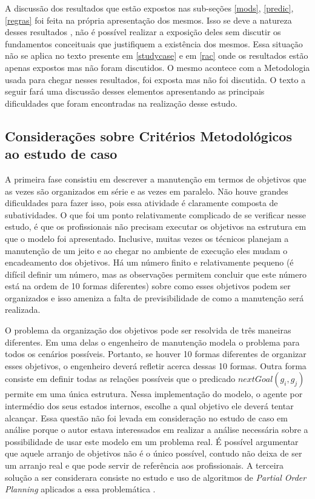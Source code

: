 A discussão dos resultados que estão expostos nas sub-seções \ref{mods}, \ref{predic}, \ref{regras} foi feita na própria apresentação dos mesmos. Isso se deve a natureza desses resultados , não é possível realizar a exposição deles sem discutir os fundamentos conceituais que justifiquem a existência dos mesmos. Essa situação não se aplica no texto presente em \ref{studycase} e em \ref{rac} onde os resultados estão apenas expostos mas não foram discutidos. O mesmo acontece com a Metodologia usada para chegar nesses resultados, foi exposta mas não foi discutida. O texto a seguir fará uma discussão desses elementos apresentando as principais dificuldades que foram encontradas na realização desse estudo. 

\subsection{Considerações sobre Critérios Metodológicos ao estudo de caso} \label{conscritmetcasoestudo}

A primeira fase consistiu em descrever a manutenção em termos de objetivos que as vezes são organizados em série e as vezes em paralelo. Não houve grandes dificuldades para fazer isso, pois essa atividade é claramente composta de subatividades. O que foi um ponto relativamente complicado de se verificar nesse estudo, é que os profissionais não precisam executar os objetivos na estrutura em que o modelo foi apresentado. Inclusive, muitas vezes os técnicos planejam a manutenção de um jeito e ao chegar no ambiente de execução eles mudam o encadeamento dos objetivos. Há um número finito e relativamente pequeno (é difícil definir um número, mas as observações permitem concluir que este número está na ordem de 10 formas diferentes) sobre como esses objetivos podem ser organizados e isso ameniza a falta de previsibilidade de como a manutenção será realizada. 

O problema da organização dos objetivos pode ser resolvida de três maneiras diferentes. Em uma delas o engenheiro de manutenção modela o problema para todos os cenários possíveis. Portanto, se houver 10 formas diferentes de organizar esses objetivos, o engenheiro deverá refletir acerca dessas 10 formas. Outra forma consiste em definir todas as relações possíveis que o predicado $nextGoal(g_i,g_j)$ permite em uma única estrutura. Nessa implementação do modelo, o agente por intermédio dos seus estados internos, escolhe a qual objetivo ele deverá tentar alcançar. Essa questão não foi levada em consideração no estudo de caso em análise porque o autor estava interessados em realizar a análise necessária sobre a possibilidade de usar este modelo em um problema real. É possível argumentar que aquele arranjo de objetivos não é o único possível, contudo não deixa de ser um arranjo real e que pode servir de referência aos profissionais. A terceira solução a ser considerara consiste no estudo e uso de algoritmos de \textit{Partial Order Planning} aplicados a essa problemática \cite{planning}. 

